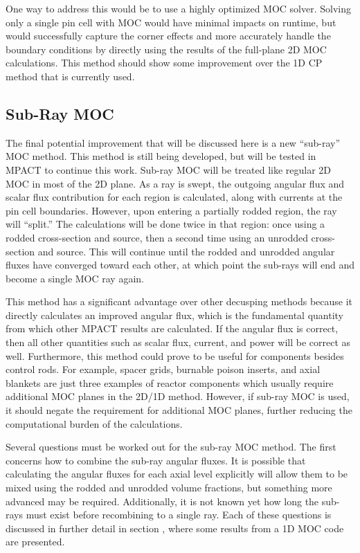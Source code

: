 One way to address this would be to use a highly optimized MOC solver.  Solving only a single pin cell with MOC would have minimal impacts on runtime, but would successfully capture the corner effects and more accurately handle the boundary conditions by directly using the results of the full-plane 2D MOC calculations.  This method should show some improvement over the 1D CP method that is currently used.

\subsection{Sub-Ray MOC}

The final potential improvement that will be discussed here is a new ``sub-ray'' MOC method.  This method is still being developed, but will be tested in MPACT to continue this work.  Sub-ray MOC will be treated like regular 2D MOC in most of the 2D plane.  As a ray is swept, the outgoing angular flux and scalar flux contribution for each region is calculated, along with currents at the pin cell boundaries.  However, upon entering a partially rodded region, the ray will ``split.''  The calculations will be done twice in that region: once using a rodded cross-section and source, then a second time using an unrodded cross-section and source.  This will continue until the rodded and unrodded angular fluxes have converged toward each other, at which point the sub-rays will end and become a single MOC ray again.

This method has a significant advantage over other decusping methods because it directly calculates an improved angular flux, which is the fundamental quantity from which other MPACT results are calculated.  If the angular flux is correct, then all other quantities such as scalar flux, current, and power will be correct as well.  Furthermore, this method could prove to be useful for components besides control rods.  For example, spacer grids, burnable poison inserts, and axial blankets are just three examples of reactor components which usually require additional MOC planes in the 2D/1D method.  However, if sub-ray MOC is used, it should negate the requirement for additional MOC planes, further reducing the computational burden of the calculations.

Several questions must be worked out for the sub-ray MOC method.  The first concerns how to combine the sub-ray angular fluxes.  It is possible that calculating the angular fluxes for each axial level explicitly will allow them to be mixed using the rodded and unrodded volume fractions, but something more advanced may be required.  Additionally, it is not known yet how long the sub-rays must exist before recombining to a single ray.  Each of these questions is discussed in further detail in section , where some results from a 1D MOC code are presented.